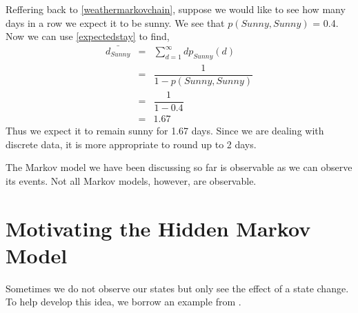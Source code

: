 \begin{example}
    Reffering back to \ref{weathermarkovchain}, suppose we would like to see how many days in a row we expect it to be sunny. We see that $p(Sunny,Sunny)$ = 0.4. Now we can use \ref{expectedstay} to find, 
    \begin{eqnarray}
        \bar{d_{Sunny}} & = & \sum_{d=1}^{\infty} d  p_{Sunny}(d) \\
              & = & \dfrac{1}{1 - p(Sunny, Sunny)} \\
              & = & \dfrac{1}{1 - 0.4} \\
              & = & 1.67
    \end{eqnarray}
    Thus we expect it to remain sunny for 1.67 days. Since we are dealing with discrete data, it is more appropriate to round up to 2 days. 
\end{example}

The Markov model we have been discussing so far is observable as we can observe its events. Not all Markov models, however, are observable.


\section{Motivating the Hidden Markov Model}

Sometimes we do not observe our states but only see the effect of a state change. To help develop this idea, we borrow an example from \cite{1165342}.


